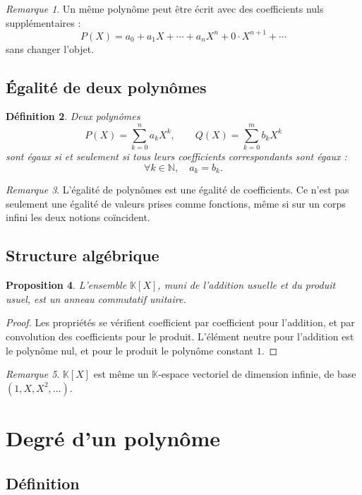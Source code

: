 \documentclass[11pt,a4paper]{article}
\newtheorem{definition}{Définition}[section]
\newtheorem{proposition}[definition]{Proposition}
\theoremstyle{remark}
\newtheorem{remarque}[definition]{Remarque}
\newcommand{\N}{\mathbb{N}}
\newcommand{\K}{\mathbb{K}}
\begin{document}
\begin{remarque}
Un même polynôme peut être écrit avec des coefficients nuls supplémentaires :
\[
P(X)=a_0+a_1X+\cdots+a_nX^n+0\cdot X^{n+1}+\cdots
\]
sans changer l’objet.
\end{remarque}

\subsection{Égalité de deux polynômes}

\begin{definition}
Deux polynômes
\[
P(X)=\sum_{k=0}^n a_kX^k,
\qquad
Q(X)=\sum_{k=0}^m b_kX^k
\]
sont égaux si et seulement si tous leurs coefficients correspondants sont égaux :
\[
\forall k\in\N,\quad a_k=b_k.
\]
\end{definition}

\begin{remarque}
L’égalité de polynômes est une égalité de coefficients. Ce n’est pas seulement une égalité de valeurs prises comme fonctions, même si sur un corps infini les deux notions coïncident.
\end{remarque}

\subsection{Structure algébrique}

\begin{proposition}
L’ensemble \(\K[X]\), muni de l’addition usuelle et du produit usuel, est un anneau commutatif unitaire.
\end{proposition}

\begin{proof}
Les propriétés se vérifient coefficient par coefficient pour l’addition, et par convolution des coefficients pour le produit. L’élément neutre pour l’addition est le polynôme nul, et pour le produit le polynôme constant \(1\).
\end{proof}

\begin{remarque}
\(\K[X]\) est même un \(\K\)-espace vectoriel de dimension infinie, de base \((1,X,X^2,\dots)\).
\end{remarque}

\section{Degré d’un polynôme}

\subsection{Définition}
\end{document}
